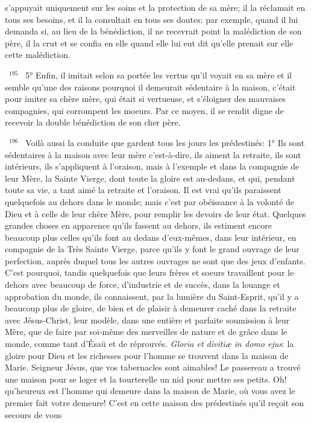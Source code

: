 \documentclass[paper=a5,pagesize=pdftex,fontsize=15pt,headinclude=on,twoside=off]{scrbook}
\newcommand{\negphantom}[1]{\settowidth{\dimen0}{#1}\hspace*{-\dimen0}}
\newcommand{\versenb}[1]{\par \vspace{10pt}~\negphantom{~${}^{#1}$~}${}^{#1}$~}
\newcommand{\latin}[1]{\emph{#1}}
\begin{document}
s'appuyait uniquement sur les soins et la protection de sa mère; il la réclamait en tous ses besoins, et il la
consultait en tous ses doutes: par exemple, quand il lui demanda si, au lieu de la bénédiction, il ne recevrait point
la malédiction de son père, il la crut et se confia en elle quand elle lui eut dit qu'elle prenait sur elle cette
malédiction.
\versenb{195} 5° Enfin, il imitait selon sa portée les vertus qu'il voyait en sa mère et il semble qu'une des raisons pourquoi il
demeurait sédentaire à la maison, c'était pour imiter sa chère mère, qui était si vertueuse, et s'éloigner des
mauvaises compagnies, qui corrompent les moeurs. Par ce moyen, il se rendit digne de recevoir la double
bénédiction de son cher père.
\versenb{196} Voilà aussi la conduite que gardent tous les jours les prédestinés:
1° Ils sont sédentaires à la maison avec leur mère c'est-à-dire, ils aiment la retraite, ils sont intérieurs, ils
s'appliquent à l'oraison, mais à l'exemple et dans la compagnie de leur Mère, la Sainte Vierge, dont toute la gloire
est au-dedans, et qui, pendant toute sa vie, a tant aimé la retraite et l'oraison. Il est vrai qu'ils paraissent
quelquefois au dehors dans le monde; mais c'est par obéissance à la volonté de Dieu et à celle de leur chère
Mère, pour remplir les devoirs de leur état. Quelques grandes choses en apparence qu'ils fassent au dehors, ils
estiment encore beaucoup plus celles qu'ils font au dedans d'eux-mêmes, dans leur intérieur, en compagnie de la
Très Sainte Vierge, parce qu'ils y font le grand ouvrage de leur perfection, auprès duquel tous les autres ouvrages
ne sont que des jeux d'enfants. C'est pourquoi, tandis quelquefois que leurs frères et soeurs travaillent pour le
dehors avec beaucoup de force, d'industrie et de succès, dans la louange et approbation du monde, ils
connaissent, par la lumière du Saint-Esprit, qu'il y a beaucoup plus de gloire, de bien et de plaisir à demeurer
caché dans la retraite avec Jésus-Christ, leur modèle, dans une entière et parfaite soumission à leur Mère, que de
faire par soi-même des merveilles de nature et de grâce dans le monde, comme tant d'Ésaü et de réprouvés.
\latin{Gloria et divitiæ in domo ejus}: la gloire pour Dieu et les richesses pour l'homme se trouvent dans la maison de
Marie.
Seigneur Jésus, que vos tabernacles sont aimables! Le passereau a trouvé une maison pour se loger et la
tourterelle un nid pour mettre ses petits. Oh! qu'heureux est l'homme qui demeure dans la maison de Marie, où
vous avez le premier fait votre demeure! C'est en cette maison des prédestinés qu'il reçoit son secours de vous
\end{document}
